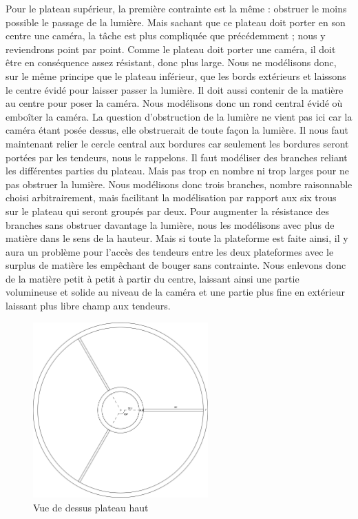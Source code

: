 \documentclass[a4paper,12pt]{article}
\begin{document}
Pour le plateau supérieur, la première contrainte est la même : obstruer le moins possible le passage de la lumière.
Mais sachant que ce plateau doit porter en son centre une caméra, la tâche est plus compliquée que précédemment ; nous y reviendrons point par point.
Comme le plateau doit porter une caméra, il doit être en conséquence assez résistant, donc plus large.
Nous ne modélisons donc, sur le même principe que le plateau inférieur, que les bords extérieurs et laissons le centre évidé pour laisser passer la lumière.  
Il doit aussi contenir de la matière au centre  pour poser la caméra. Nous modélisons donc un rond central évidé où emboîter la caméra. 
La question d’obstruction de la lumière ne vient pas ici car la caméra étant posée dessus, elle obstruerait de toute façon la lumière.
Il nous faut maintenant relier le cercle central aux bordures car seulement les bordures seront portées par les tendeurs, nous le rappelons. 
Il faut modéliser des branches reliant les différentes parties du plateau. Mais pas trop en nombre ni trop larges pour ne pas obstruer la lumière. 
Nous modélisons donc trois branches, nombre raisonnable choisi arbitrairement, mais facilitant la modélisation par rapport aux six trous sur le plateau qui seront groupés par deux. 
Pour augmenter la résistance des branches sans obstruer davantage la lumière, nous les modélisons avec plus de matière dans le sens de la hauteur.
Mais si toute la plateforme est faite ainsi, il y aura un problème pour l’accès des tendeurs entre les deux plateformes avec le surplus de matière les empêchant de bouger sans contrainte. 
Nous enlevons donc de la matière petit à petit à partir du centre, laissant ainsi une partie volumineuse et solide au niveau de la caméra et une partie plus fine en extérieur laissant plus libre champ aux tendeurs.

\begin{figure}[H]
  \centering
  \includegraphics[width=0.6\textwidth]{vue de dessus plateau haut.jpg}
  \caption{Vue de dessus plateau haut}
\end{figure}
\end{document}
